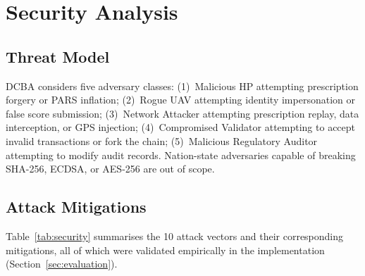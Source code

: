 \documentclass[sigplan,screen,review=false]{acmart}
\begin{document}
\section{Security Analysis}
\label{sec:security}

\subsection{Threat Model}

DCBA considers five adversary classes: (1)~Malicious HP attempting
prescription forgery or PARS inflation; (2)~Rogue UAV attempting
identity impersonation or false score submission; (3)~Network Attacker
attempting prescription replay, data interception, or GPS injection;
(4)~Compromised Validator attempting to accept invalid transactions or
fork the chain; (5)~Malicious Regulatory Auditor attempting to modify
audit records. Nation-state adversaries capable of breaking SHA-256,
ECDSA, or AES-256 are out of scope.

\subsection{Attack Mitigations}

Table~\ref{tab:security} summarises the 10 attack vectors and their
corresponding mitigations, all of which were validated empirically in
the implementation (Section~\ref{sec:evaluation}).
\end{document}
